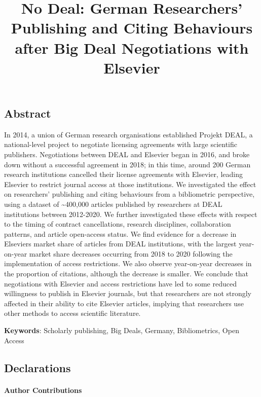 \documentclass[
]{article}
\title{No Deal: German Researchers' Publishing and Citing Behaviours after Big Deal Negotiations with Elsevier}
\author{}
\date{\vspace{-2.5em}}
\begin{document}
\maketitle

\hypertarget{abstract}{%
\subsection*{Abstract}\label{abstract}}

In 2014, a union of German research organisations established Projekt DEAL, a national-level project to negotiate licensing agreements with large scientific publishers. Negotiations between DEAL and Elsevier began in 2016, and broke down without a successful agreement in 2018; in this time, around 200 German research institutions cancelled their license agreements with Elsevier, leading Elsevier to restrict journal access at those institutions. We investigated the effect on researchers' publishing and citing behaviours from a bibliometric perspective, using a dataset of \textasciitilde400,000 articles published by researchers at DEAL institutions between 2012-2020. We further investigated these effects with respect to the timing of contract cancellations, research disciplines, collaboration patterns, and article open-access status. We find evidence for a decrease in Elsevier\textquotesingle s market share of articles from DEAL institutions, with the largest year-on-year market share decreases occurring from 2018 to 2020 following the implementation of access restrictions. We also observe year-on-year decreases in the proportion of citations, although the decrease is smaller. We conclude that negotiations with Elsevier and access restrictions have led to some reduced willingness to publish in Elsevier journals, but that researchers are not strongly affected in their ability to cite Elsevier articles, implying that researchers use other methods to access scientific literature.

\textbf{Keywords}: Scholarly publishing, Big Deals, Germany, Bibliometrics, Open Access

\hypertarget{declarations}{%
\subsection*{Declarations}\label{declarations}}

\hypertarget{author-contributions}{%
\paragraph*{Author Contributions}\label{author-contributions}}
\end{document}
